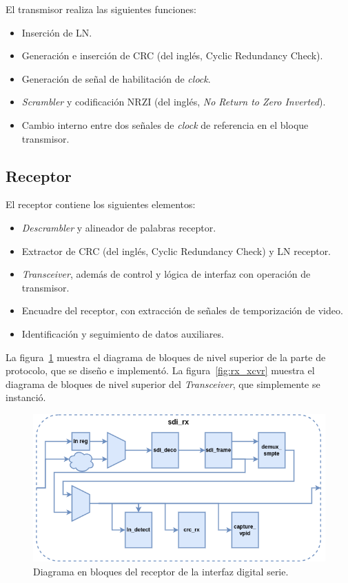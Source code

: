   El transmisor realiza las siguientes funciones:
  \begin{itemize}
      \item Inserción de LN\@.
      \item Generación e inserción de CRC  (del inglés, Cyclic Redundancy Check)\@.
      \item Generación de señal de habilitación de \textit{clock}.
      \item \textit{Scrambler} y codificación NRZI (del inglés, \textit{No Return to Zero Inverted}).
      \item Cambio interno entre dos señales de \textit{clock} de referencia en el bloque transmisor.
  \end{itemize}

\subsection{Receptor}

  El receptor contiene los siguientes elementos:
  \begin{itemize}
      \item \textit{Descrambler} y alineador de palabras receptor.
      \item Extractor de CRC  (del inglés, Cyclic Redundancy Check) y LN receptor.
      \item \textit{Transceiver}, además de control y lógica de interfaz con operación de transmisor.
      \item Encuadre del receptor, con extracción de señales de temporización de video.
      \item Identificación y seguimiento de datos auxiliares.
  \end{itemize}

  La figura~\ref{fig:sdi_rx} muestra el diagrama de bloques de nivel superior de
  la parte de protocolo, que se diseño e implementó. La figura~\ref{fig:rx_xcvr}
  muestra el diagrama de bloques de nivel superior del \textit{Transceiver}, que
  simplemente se instanció.

  \begin{figure}[htbp]
      \centering
      \includegraphics[width=\linewidth]{./Figures/sdi_rx.png}
      \caption{Diagrama en bloques del receptor de la interfaz digital serie.}\label{fig:sdi_rx}
  \end{figure}
  \vspace{1cm}

